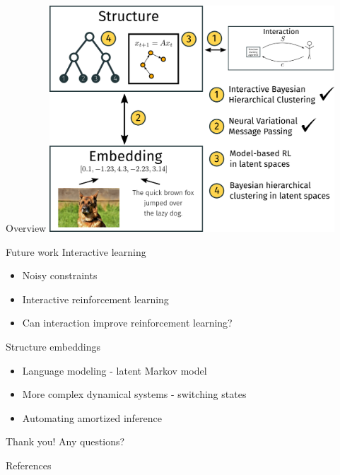 \documentclass[10pt, compress]{beamer}
\begin{document}
\begin{frame}{Overview}
  \centering
  \includegraphics[width=0.8\textwidth]{img/overview-4}
\end{frame}

\begin{frame}{Future work}
    Interactive learning
    \begin{itemize}
    \pause
        \item Noisy constraints
    \pause
        \item Interactive reinforcement learning
    \pause
        \item Can interaction improve reinforcement learning?
    \end{itemize}
    
    Structure embeddings
    \begin{itemize}
    \pause
        \item Language modeling - latent Markov model
    \pause
        \item More complex dynamical systems - switching states
    \pause
        \item Automating amortized inference
    \end{itemize}
    \pause
\end{frame}

\begin{frame}[standout]
    Thank you! Any questions?
\end{frame}


\begin{frame}[allowframebreaks]{References}
    
     
\end{frame}
\end{document}
